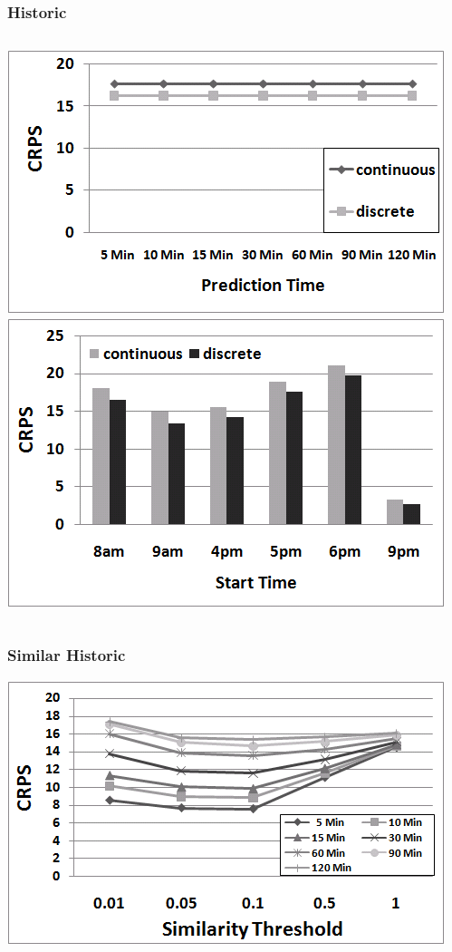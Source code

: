 \documentclass[t]{beamer}
\begin{document}
\begin{frame}\frametitle{Historic}
\vspace{0.5in}
\begin{columns}
		\includegraphics[scale=0.3]{Links_Historic.png}
		\includegraphics[scale=0.3]{Links_Historic_TOD.png}
\end{columns}
\end{frame}

\begin{frame}\frametitle{Similar Historic}
\begin{center}
	\includegraphics[scale=0.5]{Links_Filtered.png}
\end{center}
\end{frame}
\end{document}
